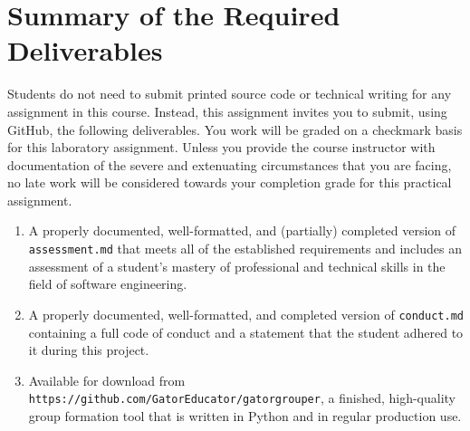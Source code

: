 \documentclass[11pt]{article}
\newcommand{\assessment}{\lstinline{assessment.md}}
\newcommand{\conduct}{\lstinline{conduct.md}}
\newcommand{\url}[1]{\lstinline{#1}}
\begin{document}
\section*{Summary of the Required Deliverables}

\noindent Students do not need to submit printed source code or technical
writing for any assignment in this course. Instead, this assignment invites you
to submit, using GitHub, the following deliverables. You work will be graded on
a checkmark basis for this laboratory assignment.
%
Unless you provide the course instructor with documentation of the severe and
extenuating circumstances that you are facing, no late work will be considered
towards your completion grade for this practical assignment.

\begin{enumerate}

\setlength{\itemsep}{0in}

\item A properly documented, well-formatted, and (partially) completed version
  of \assessment{} that meets all of the established requirements and includes
  an assessment of a student's mastery of professional and technical skills in
  the field of software engineering.

\item A properly documented, well-formatted, and completed version of \conduct{}
  containing a full code of conduct and a statement that the student adhered to
  it during this project.

\item Available for download from
  \url{https://github.com/GatorEducator/gatorgrouper}, a finished, high-quality
  group formation tool that is written in Python and in regular production use.

\end{enumerate}
\end{document}
